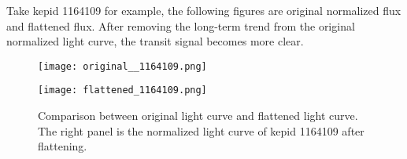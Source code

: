       \begin{table}[!htp]
        \centering
        \centering
        \caption[Parameter values chosen in the LightKurve flatten method.]
          {Parameter values chosen in the LightKurve flatten method. The detailed 
          descriptions of these parameters can be found on the lightkurve official 
          website.}
        \label{table: params_1162345}
      \end{table}

      Take kepid 1164109 for example, the following figures are original normalized flux 
      and flattened flux. After removing the long-term trend from the original normalized 
      light curve, the transit signal becomes more clear. 

      \begin{figure}[!ht]  
        \begin{center}
        \begin{minipage}{0.45\textwidth}
          \begin{center} 
              \texttt{[image: original\_\_1164109.png]}
          \end{center}
        \end{minipage}
        \begin{minipage}{0.45\textwidth}
          \begin{center} 
              \texttt{[image: flattened\_1164109.png]}
          \end{center}
        \end{minipage}
      \end{center}
      \begin{center}
        \caption[Comparison between original light curve and flattened light curve.]
          {Comparison between original light curve and flattened light curve. The right 
          panel is the normalized light curve of kepid 1164109 after flattening. }
        \label{fig: 1164109_comparison}
        \end{center}
      \end{figure}

